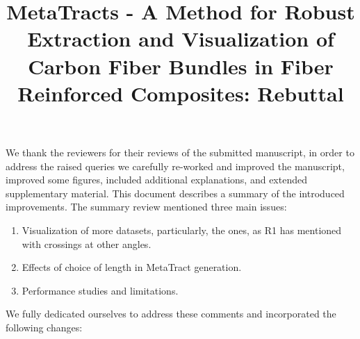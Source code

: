 \documentclass[]{article}
\title{MetaTracts - A Method for Robust Extraction and Visualization of Carbon Fiber Bundles in Fiber Reinforced Composites: Rebuttal}
\author{}
\begin{document}
\maketitle
We thank the reviewers for their reviews of the submitted manuscript, in order to address the raised queries we carefully re-worked and improved the manuscript, improved some figures, included additional explanations, and extended supplementary material. This document describes a summary of the introduced improvements. The summary review mentioned three main issues: 
\begin{enumerate}
	   \item  Visualization of more datasets, particularly, the ones, as R1 has
	   mentioned with crossings at other angles.
	   \item Effects of choice of length in MetaTract generation.
	   \item Performance studies and limitations.
\end{enumerate}
We fully dedicated ourselves to address these comments and incorporated the following changes:
\end{document}
